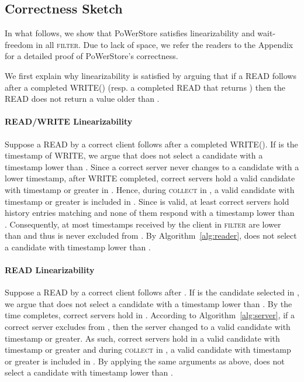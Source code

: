 \documentclass[10pt,conference,compsocconf]{IEEEtran}
\newcommand{\protocol}{PoWerStore}
\begin{document}
\subsection{Correctness Sketch} \label{sec:pow-sketch}

In what follows, we show that \protocol{} satisfies linearizability and wait-freedom in all \textsc{filter}. Due to lack of space, we refer the readers to the Appendix for a detailed proof of \protocol's correctness.



We first explain why linearizability is satisfied by arguing that if a \textsc{READ} follows after a completed \textsc{WRITE}() (resp. a completed \textsc{READ} that returns ) then the \textsc{READ} does not return a value older than .

\paragraph{\textsc{READ}/\textsc{WRITE} Linearizability}
Suppose a \textsc{READ}  by a correct client follows after a completed \textsc{WRITE}(). If  is the timestamp of \textsc{WRITE}, we argue that  does not select a candidate with a timestamp lower than . Since a correct server never changes  to a candidate with a lower timestamp, after \textsc{WRITE} completed,  correct servers hold a valid candidate with timestamp  or greater in . Hence, during \textsc{collect} in , a valid candidate  with timestamp  or greater is included in . Since  is valid, at least  correct servers hold history entries matching  and none of them respond with a timestamp lower than . Consequently, at most  timestamps received by the client in \textsc{filter} are lower than  and thus  is never excluded from . By Algorithm~\ref{alg:reader},  does not select a candidate with timestamp lower than .

\paragraph{\textsc{READ} Linearizability}
Suppose a \textsc{READ}  by a correct client follows after . If  is the candidate selected in , we argue that  does not select a candidate with a timestamp lower than .
By the time  completes,  correct servers hold  in . According to Algorithm~\ref{alg:server}, if a correct server excludes  from , then the server changed  to a valid candidate with timestamp  or greater. As such,  correct servers hold in  a valid candidate with timestamp  or greater and during \textsc{collect} in , a valid candidate  with timestamp  or greater is included in . By applying the same arguments as above,  does not select a candidate with timestamp lower than .
\end{document}
